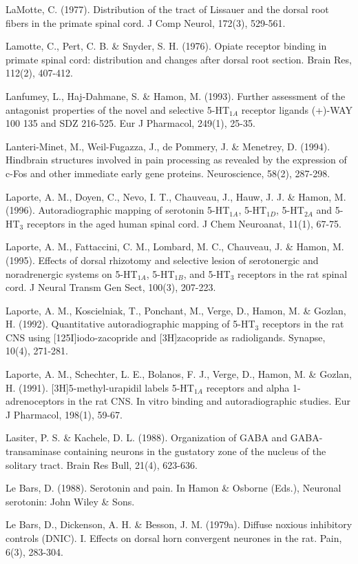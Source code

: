 \documentclass[a4paper,12pt,twoside]{report}
\begin{document}
\begin{singlespacing}
\begin{footnotesize}
LaMotte, C. (1977). Distribution of the tract of Lissauer and the dorsal root fibers in the primate spinal cord. J Comp Neurol, 172(3), 529-561.

Lamotte, C., Pert, C. B. \& Snyder, S. H. (1976). Opiate receptor binding in primate spinal cord: distribution and changes after dorsal root section. Brain Res, 112(2), 407-412.

Lanfumey, L., Haj-Dahmane, S. \& Hamon, M. (1993). Further assessment of the antagonist properties of the novel and selective 5-HT$_{1A}$ receptor ligands (+)-WAY 100 135 and SDZ 216-525. Eur J Pharmacol, 249(1), 25-35.

Lanteri-Minet, M., Weil-Fugazza, J., de Pommery, J. \& Menetrey, D. (1994). Hindbrain structures involved in pain processing as revealed by the expression of c-Fos and other immediate early gene proteins. Neuroscience, 58(2), 287-298.

Laporte, A. M., Doyen, C., Nevo, I. T., Chauveau, J., Hauw, J. J. \& Hamon, M. (1996). Autoradiographic mapping of serotonin 5-HT$_{1A}$, 5-HT$_{1D}$, 5-HT$_{2A}$ and 5-HT$_{3}$ receptors in the aged human spinal cord. J Chem Neuroanat, 11(1), 67-75.

Laporte, A. M., Fattaccini, C. M., Lombard, M. C., Chauveau, J. \& Hamon, M. (1995). Effects of dorsal rhizotomy and selective lesion of serotonergic and noradrenergic systems on 5-HT$_{1A}$, 5-HT$_{1B}$, and 5-HT$_{3}$ receptors in the rat spinal cord. J Neural Transm Gen Sect, 100(3), 207-223.

Laporte, A. M., Koscielniak, T., Ponchant, M., Verge, D., Hamon, M. \& Gozlan, H. (1992). Quantitative autoradiographic mapping of 5-HT$_{3}$ receptors in the rat CNS using [125I]iodo-zacopride and [3H]zacopride as radioligands. Synapse, 10(4), 271-281.

Laporte, A. M., Schechter, L. E., Bolanos, F. J., Verge, D., Hamon, M. \& Gozlan, H. (1991). [3H]5-methyl-urapidil labels 5-HT$_{1A}$ receptors and alpha 1-adrenoceptors in the rat CNS. In vitro binding and autoradiographic studies. Eur J Pharmacol, 198(1), 59-67.

Lasiter, P. S. \& Kachele, D. L. (1988). Organization of GABA and GABA-transaminase containing neurons in the gustatory zone of the nucleus of the solitary tract. Brain Res Bull, 21(4), 623-636.

Le Bars, D. (1988). Serotonin and pain. In Hamon \& Osborne (Eds.), Neuronal serotonin: John Wiley \& Sons.

Le Bars, D., Dickenson, A. H. \& Besson, J. M. (1979a). Diffuse noxious inhibitory controls (DNIC). I. Effects on dorsal horn convergent neurones in the rat. Pain, 6(3), 283-304.


\end{footnotesize}
\end{singlespacing}
\end{document}

